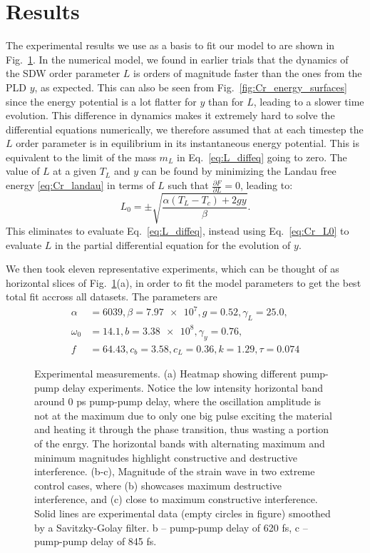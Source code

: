 \section{Results}
The experimental results we use as a basis to fit our model to are shown in Fig.~\ref{fig:Cr_experimental}. In the numerical model, we found in earlier trials that the dynamics of the SDW order parameter $L$ is orders of magnitude faster than the ones from the PLD $y$, as expected. This can also be seen from Fig.~\ref{fig:Cr_energy_surfaces} since the energy potential is a lot flatter for $y$ than for $L$, leading to a slower time evolution. This difference in dynamics makes it extremely hard to solve the differential equations numerically, we therefore assumed that at each timestep the $L$ order parameter is in equilibrium in its instantaneous energy potential. This is equivalent to the limit of the mass $m_L$ in Eq.~\ref{eq:L_diffeq} going to zero.
The value of $L$ at a given $T_L$ and $y$ can be found by minimizing the Landau free energy \ref{eq:Cr_landau} in terms of $L$ such that $\frac{\partial F}{\partial L} = 0$, leading to:
\begin{equation}
	\label{eq:Cr_L0}
	L_0 = \pm \sqrt{\frac{\alpha (T_L - T_c) + 2 g y}{\beta}}.
\end{equation}
This eliminates to evaluate Eq.~\ref{eq:L_diffeq}, instead using Eq.~\ref{eq:Cr_L0} to evaluate $L$ in the partial differential equation for the evolution of $y$.

We then took eleven representative experiments, which can be thought of as horizontal slices of Fig.~\ref{fig:Cr_experimental}(a), in order to fit the model parameters to get the best total fit accross all datasets. The parameters are
\begin{align}
	\alpha &= 6039, \beta = \SI{7.97e7}, g = 0.52, \gamma_L = 25.0, \\
	\omega_0 &= 14.1, b = \SI{3.38e8}, \gamma_y = 0.76,\\
	f &= 64.43, c_b = 3.58, c_L = 0.36, k = 1.29, \tau = 0.074
\end{align}

\begin{figure}
\caption{\label{fig:Cr_experimental}Experimental measurements. (a) Heatmap showing different pump-pump delay experiments. Notice the low intensity horizontal band around 0 ps pump-pump delay, where the oscillation amplitude is not at the maximum due to only one big pulse exciting the material and heating it through the phase transition, thus wasting a portion of the enrgy. The horizontal bands with alternating maximum and minimum magnitudes highlight constructive and destructive interference. (b-c), Magnitude of the strain wave in two extreme control cases, where (b) showcases maximum destructive interference, and (c) close to maximum constructive interference. Solid lines are experimental data (empty circles in figure) smoothed by a Savitzky-Golay filter.  b – pump-pump delay of 620 fs, c – pump-pump delay of 845 fs.}
\end{figure}

